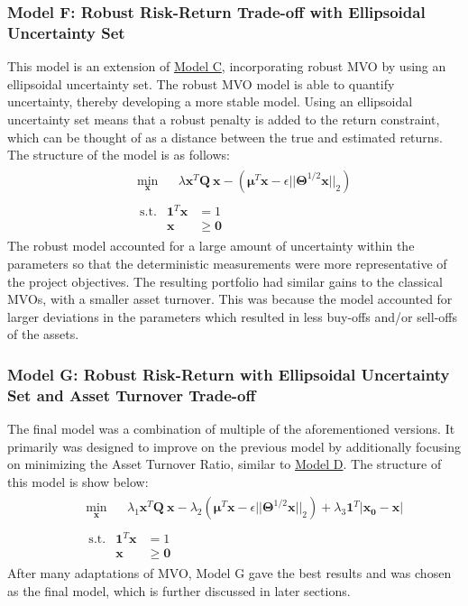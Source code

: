 \documentclass[10pt]{article}
\begin{document}
\subsubsection{Model F: Robust Risk-Return Trade-off with Ellipsoidal Uncertainty Set}
\label{sec:modelF}
This model is an extension of \hyperref[sec:modelC] {\color{blue}Model C}, incorporating robust MVO by using an ellipsoidal uncertainty set. The robust MVO model is able to quantify uncertainty, thereby developing a more stable model. Using an ellipsoidal uncertainty set means that a robust penalty is added to the return constraint, which can be thought of as a distance between the true and estimated returns. The structure of the model is as follows:
\[
\begin{aligned}
&\begin{aligned}
    & \min_{\bm{x}}     &&\lambda \bm{x}^T \bm{Q}\ \bm{x} - (\bm{\mu}^T \bm{x}  - \epsilon || \bm{\Theta}^{1/2}\bm{x} ||_2)
\end{aligned} \\
&\begin{aligned}
    &\ \mathrm{s.t.}        & \bm{1}^T \bm{x} &= 1 \\
    &                   & \bm{x} &\geq \bm{0}
\end{aligned}
\end{aligned}
\]
The robust model accounted for a large amount of uncertainty within the parameters so that the deterministic measurements were more representative of the project objectives. The resulting portfolio had similar gains to the classical MVOs, with a smaller asset turnover. This was because the model accounted for larger deviations in the parameters which resulted in less buy-offs  and/or sell-offs of the assets.
\subsubsection{Model G: Robust Risk-Return with Ellipsoidal Uncertainty Set and Asset Turnover Trade-off}
\label{sec:modelG}
The final model was a combination of multiple of the aforementioned versions. It primarily was designed to improve on the previous model by additionally focusing on minimizing the Asset Turnover Ratio, similar to \hyperref[sec:modelD] {\color{blue}Model D}. The structure of this model is show below:
\[
\begin{aligned}
&\begin{aligned}
    & \min_{\bm{x}}     &&\lambda_1 \bm{x}^T \bm{Q}\ \bm{x} - \lambda_2(\bm{\mu}^T \bm{x}  - \epsilon || \bm{\Theta}^{1/2}\bm{x} ||_2) + \lambda_3 \bm{1}^T |\bm{x_0} - \bm{x}|
\end{aligned} \\
&\begin{aligned}
    &\ \mathrm{s.t.}        & \bm{1}^T \bm{x} &= 1 \\
    &                   & \bm{x} &\geq \bm{0}
\end{aligned}
\end{aligned}
\]
After many adaptations of MVO, Model G gave the best results and was chosen as the final model, which is further discussed in later sections. 
\end{document}
